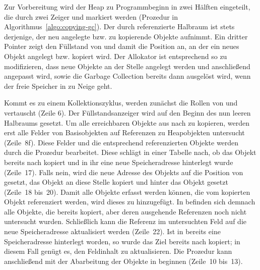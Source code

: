 Zur Vorbereitung wird der Heap zu Programmbeginn in zwei Hälften eingeteilt, die durch zwei Zeiger  und  markiert werden (Prozedur  in Algorithmus~\ref{algo:copying-gc}).
Der durch  referenzierte Halbraum ist stets derjenige, der neu angelegte bzw. zu kopierende Objekte aufnimmt.
Ein dritter Pointer  zeigt den Füllstand von  und damit die Position an, an der ein neues Objekt angelegt bzw. kopiert wird.
Der Allokator ist entsprechend so zu modifizieren, dass neue Objekte an der Stelle  angelegt werden und  anschließend angepasst wird, sowie die Garbage Collection bereits dann ausgelöst wird, wenn der freie Speicher in  zu Neige geht.

Kommt es zu einem Kollektionszyklus, werden zunächst die Rollen von  und  vertauscht (Zeile 6).
Der Füllstandsanzeiger  wird auf den Beginn des nun leeren Halbraums  gesetzt.
Um alle erreichbaren Objekte aus  nach  zu kopieren, werden erst alle Felder von Basisobjekten auf Referenzen zu Heapobjekten untersucht (Zeile~8f).
Diese Felder und die entsprechend referenzierten Objekte werden durch die Prozedur  bearbeitet.
Diese schlägt in einer Tabelle  nach, ob das Objekt bereits nach  kopiert und in ihr eine neue Speicheradresse hinterlegt wurde (Zeile~17).
Falls nein, wird die neue Adresse des Objekts auf die Position von  gesetzt, das Objekt an diese Stelle kopiert und  hinter das Objekt gesetzt (Zeile~18 bis~20).
Damit alle Objekte erfasst werden können, die vom kopierten Objekt referenziert werden, wird dieses zu  hinzugefügt.
In  befinden sich demnach alle Objekte, die bereits kopiert, aber deren ausgehende Referenzen noch nicht untersucht wurden.
Schließlich kann die Referenz im untersuchten Feld auf die neue Speicheradresse aktualisiert werden (Zeile~22).
Ist in  bereits eine Speicheradresse hinterlegt worden, so wurde das Ziel bereits nach  kopiert; in diesem Fall genügt es, den Feldinhalt zu aktualisieren.
Die Prozedur  kann anschließend mit der Abarbeitung der Objekte in  beginnen (Zeile~10 bis~13).


